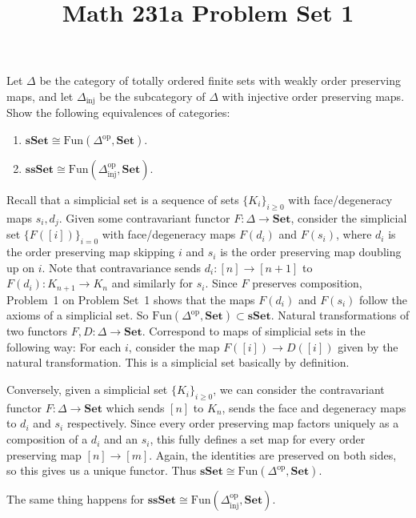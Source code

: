 \documentclass[11pt,letterpaper]{article}
\title{\textbf{Math 231a Problem Set 1}}
\begin{document}
\maketitle

\begin{problem}
    Let $\Delta$ be the category of totally ordered finite sets with weakly order preserving maps, and let $\Delta_{\text{inj}}$ be the subcategory of $\Delta$ with injective order preserving maps. Show the following equivalences of categories: 
    \begin{enumerate}
        \item $\mathbf{sSet} \cong \textrm{Fun}(\Delta^{\text{op}}, \mathbf{Set})$. 
        \item $\mathbf{ssSet} \cong \textrm{Fun}(\Delta_{\text{inj}}^{\text{op}}, \mathbf{Set})$. 
    \end{enumerate}
\end{problem}

\begin{solution}
    Recall that a simplicial set is a sequence of sets $\{K_i\}_{i\geq 0}$ with face/degeneracy maps $s_i, d_j$. Given some contravariant functor $F : \Delta \to \mathbf{Set}$, consider the simplicial set $\{F([i])\}_{i=0}$ with face/degeneracy maps $F(d_i)$ and $F(s_i)$, where $d_i$ is the order preserving map skipping $i$ and $s_i$ is the order preserving map doubling up on $i$. Note that contravariance sends $d_i : [n] \to [n+1]$ to $F(d_i) : K_{n+1} \to K_n$ and similarly for $s_i$. Since $F$ preserves composition, Problem~1 on Problem Set~1 shows that the maps $F(d_i)$ and $F(s_i)$ follow the axioms of a simplicial set. So $\textrm{Fun}(\Delta^\text{op}, \mathbf{Set}) \subset \mathbf{sSet}$. Natural transformations of two functors $F, D: \Delta \to \mathbf{Set}$. Correspond to maps of simplicial sets in the following way: For each $i$, consider the map $F([i]) \to D([i])$ given by the natural transformation. This is a simplicial set basically by definition.
    
    Conversely, given a simplicial set $\{K_i\}_{i\geq 0}$, we can consider the contravariant functor $F : \Delta \to \mathbf{Set}$ which sends $[n]$ to $K_n$, sends the face and degeneracy maps to $d_i$ and $s_i$ respectively. Since every order preserving map factors uniquely as a composition of a $d_i$ and an $s_i$, this fully defines a set map for every order preserving map $[n] \to [m]$. Again, the identities are preserved on both sides, so this gives us a unique functor. Thus $\mathbf{sSet} \cong \textrm{Fun}(\Delta^{\text{op}}, \mathbf{Set})$.  

    The same thing happens for $\mathbf{ssSet}\cong \text{Fun}(\Delta^{\text{op}}_{\text{inj}}, \mathbf{Set})$.  
\end{solution}
\end{document}
